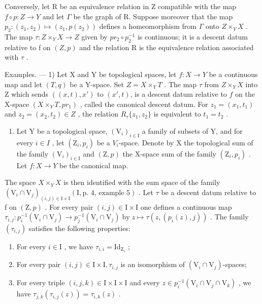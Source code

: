 Conversely, let R be an equivalence relation in Z compatible with the map \(f \circ p: Z \to Y\) and let \(\Gamma\) be the graph of R. Suppose moreover that the map \(p_{2}: (z_{1}, z_{2}) \mapsto (z_{1}, p(z_{2}))\) defines a homeomorphism from \(\Gamma\) onto \(Z \times_{Y} X\) . The map \(\tau: Z \times_{Y} X \to Z\) given by \(pr_{2} \circ p_{2}^{-1}\) is continuous; it is a descent datum relative to f on \((Z, p)\) and the relation R is the equivalence relation associated with \(\tau\) .

Examples. --- 1) Let X and Y be topological spaces, let \(f\colon X \to Y\) be a continuous map and let \((T,q)\) be a Y-space. Set \(Z = X \times_Y T\) . The map \(\tau\) from \(Z \times_Y X\) into Z which sends \(((x,t),x')\) to \((x',t)\), is a descent datum relative to \(f\) on the X-space \((X \times_Y T, pr_1)\) , called the canonical descent datum. For \(z_1 = (x_1, t_1)\) and \(z_2 = (x_2, t_2) \in Z\) , the relation \(R_{\tau}\{z_1, z_2\}\) is equivalent to \(t_1 = t_2\) .

\begin{enumerate}
\def\labelenumi{\arabic{enumi})}
\setcounter{enumi}{1}
\tightlist
\item
  Let Y be a topological space, \((\mathrm{V}_{i})_{i\in\mathrm{I}}\) a family of subsets of Y, and for every \(i\in I\) , let \((\mathrm{Z}_{i},p_{i})\) be a \(V_{i}\)-space. Denote by X the topological sum of the family \((\mathrm{V}_{i})_{i\in\mathrm{I}}\) and \((\mathrm{Z},p)\) the X-space sum of the family \((\mathrm{Z}_{i},p_{i})\) . Let \(f:X\to Y\) be the canonical map.
\end{enumerate}

The space \(X \times_{Y} X\) is then identified with the sum space of the family \((\mathrm{V}_{i} \cap \mathrm{V}_{j})_{(i,j) \in \mathrm{I} \times \mathrm{I}}(\mathrm{I}, \text{p.~4, example 5})\) . Let \(\tau\) be a descent datum relative to f on \((\mathrm{Z}, p)\) . For every pair \((i, j) \in \mathrm{I} \times \mathrm{I}\) one defines a continuous map \(\tau_{i,j}\colon p_{i}^{-1}(\mathrm{V}_{i}\cap\mathrm{V}_{j})\to p_{j}^{-1}(\mathrm{V}_{i}\cap\mathrm{V}_{j})\;\text{by}\;z\mapsto\tau(z,(p_{i}(z),j))\) . The family \((\tau_{i,j})\) satisfies the following properties:

\begin{enumerate}
\def\labelenumi{(\roman{enumi})}
\item
  For every \(i \in \mathrm{I}\) , we have \(\tau_{i,i} = \mathrm{Id}_{\mathrm{Z}_i}\) ;
\item
  For every pair \((i,j)\in \mathrm{I}\times \mathrm{I},\tau_{i,j}\) is an isomorphism of \((\mathrm{V}_i\cap \mathrm{V}_j)\)-spaces;
\item
  For every triple \((i,j,k)\in\mathrm{I}\times \mathrm{I}\times \mathrm{I}\) and every \(z\in p_i^{-1} (\mathrm{V}_i\cap \mathrm{V}_j\cap \mathrm{V}_k)\) , we have \(\tau_{j,k}(\tau_{i,j}(z)) = \tau_{i,k}(z)\) .
\end{enumerate}

